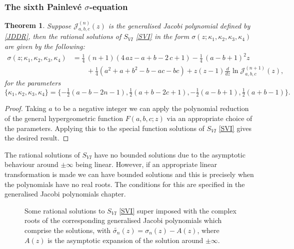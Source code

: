 \documentclass[12pt]{article}
\def\P{Painlev\'e }
\def\J{\mathcal{J}}
\newtheorem{mydef}{Theorem}[section]
\numberwithin{figure}{section}
\numberwithin{equation}{section}
\numberwithin{table}{section}
\begin{document}
\subsubsection{The sixth \P $\sigma$-equation}
\begin{mydef}
Suppose $\J_{a,b,c}^{(n)}(z)$ is the generalised Jacobi polynomial defined by \eqref{JDDR}, then the rational solutions of $S_{VI}$ \eqref{SVI} in the form $\sigma(z;\kappa_1,\kappa_2,\kappa_3,\kappa_4)$ are given by the following:
\begin{align*}
\sigma(z;\kappa_1,\kappa_2,\kappa_3,\kappa_4)&=\tfrac{1}{4}\,(n+1) \left( 4\,az-a+b-2\,c+1 \right) -\tfrac{1}{4}\, \left(a-b+1\right) ^{2
}z\\
&\qquad+\tfrac{1}{4} \left(a^2+a+b^2-b-ac-bc\right)+z(z-1)\frac{d}{dz}\ln\J_{a,b,c}^{(n+1)}(z),
\end{align*}
for the parameters
$$
\{\kappa_1,\kappa_2,\kappa_3,\kappa_4\}=\{-\tfrac{1}{2}(a-b-2n-1),\tfrac{1}{2}(a+b-2c+1),-\tfrac{1}{2}(a-b+1),\tfrac{1}{2}(a+b-1)\}.
$$
\end{mydef}
\begin{proof}
Taking $a$ to be a negative integer we can apply the polynomial reduction of the general hypergeometric function $F(a,b,c;z)$ via an appropriate choice of the parameters. Applying this to the special function solutions of $S_{VI}$ \eqref{SVI} gives the desired result.
\end{proof}
The rational solutions of $S_{VI}$ have no bounded solutions due
to the asymptotic behaviour around $\pm\infty$ being linear. However, if an appropriate linear transformation is made we can have bounded solutions and this is precisely when the polynomials have no real roots. The conditions for this are specified in the generalised Jacobi polynomials chapter.

\begin{figure}[H]
\centering
{}
\caption{Some rational solutions to $S_{VI}$ \eqref{SVI} super imposed with the complex roots of the corresponding generalised Jacobi polynomials which comprise the solutions, with $\widetilde{\sigma_n}(z)=\sigma_n(z)-A(z)$, where $A(z)$ is the asymptotic expansion of the solution around $\pm\infty$.}
\end{figure}
\end{document}
